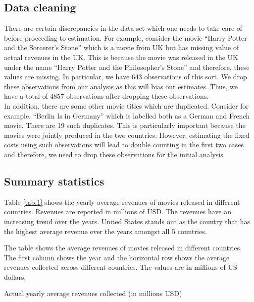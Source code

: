 \documentclass[11pt, letterpaper]{article} \usepackage{amsmath}
\newcommand{\floatintro}[1]{
  
  \vspace*{0.1in}
  
  {\footnotesize

    #1
    
  }
  
  \vspace*{0.1in} } \newcommand{\Hline}{\noindent\rule{18cm}{0.5pt}}
\begin{document}
\subsection{Data cleaning}
There are certain discrepancies in the data set which one needs to
take care of before proceeding to estimation. For example, consider
the movie ``Harry Potter and the Sorcerer's Stone'' which is a movie
from UK but has missing value of actual revenues in the UK. This is
because the movie was released in the UK under the name ``Harry Potter
and the Philosopher's Stone'' and therefore, these values are
missing. In particular, we have 643 observations of this sort. We drop
these observations from our analysis as this will bias our
estimates. Thus, we have a total of 4857 observations after
dropping these observations. \\
In addition, there are some other movie titles which are
duplicated. Consider for example, ``Berlin Is in Germany'' which is
labelled both as a German and French movie. There are 19 such
duplicates. This is particularly important because the movies were
jointly produced in the two countries. However, estimating the fixed
costs using such observations will lead to double counting in the
first two cases and therefore, we need to drop these observations for
the initial analysis.
\subsection{Summary statistics}
Table \ref{tab:1} shows the yearly average revenues of movies released
in different countries. Revenues are reported in millions of USD. The
revenues have an increasing trend over the years. United States stands
out as the country that has the highest average revenue over the years
amongst all 5 countries.
\begin{table}[htbp!]
  \floatintro{The table shows the average revenues of movies released
    in different countries. The first column shows the year and the
    horizontal row shows the average revenues collected across
    different countries. The values are in millions of US dollars.}
  \centering
  
  \caption{Actual yearly average revenues collected (in millions USD)}
  \label{tab:1}
\end{table}
\end{document}
